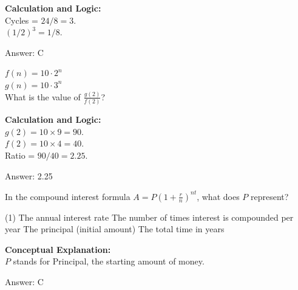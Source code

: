 \documentclass[11pt,paper=a4,answers]{exam}
\begin{document}
\begin{questions}
\begin{solution}
\textbf{Calculation and Logic:} \\
Cycles = $24 / 8 = 3$. \\
$(1/2)^3 = 1/8$.

\vspace{25pt}

Answer: \colorbox{yellow!100}{C}
\end{solution}

\vspace{40pt}

\question
$f(n) = 10 \cdot 2^n$ \\
$g(n) = 10 \cdot 3^n$ \\
What is the value of $\frac{g(2)}{f(2)}$?

\begin{solution}
\textbf{Calculation and Logic:} \\
$g(2) = 10 \times 9 = 90$. \\
$f(2) = 10 \times 4 = 40$. \\
Ratio = $90 / 40 = 2.25$.

\vspace{25pt}

Answer: \colorbox{yellow!100}{2.25}
\end{solution}

\vspace{40pt}

\question
In the compound interest formula $A = P(1 + \frac{r}{n})^{nt}$, what does $P$ represent?
\begin{tasks}(1)
    \task The annual interest rate
    \task The number of times interest is compounded per year
    \task The principal (initial amount)
    \task The total time in years
\end{tasks}

\begin{solution}
\textbf{Conceptual Explanation:} \\
$P$ stands for Principal, the starting amount of money.

\vspace{25pt}

Answer: \colorbox{yellow!100}{C}
\end{solution}

\vspace{40pt}


\end{questions}
\end{document}
